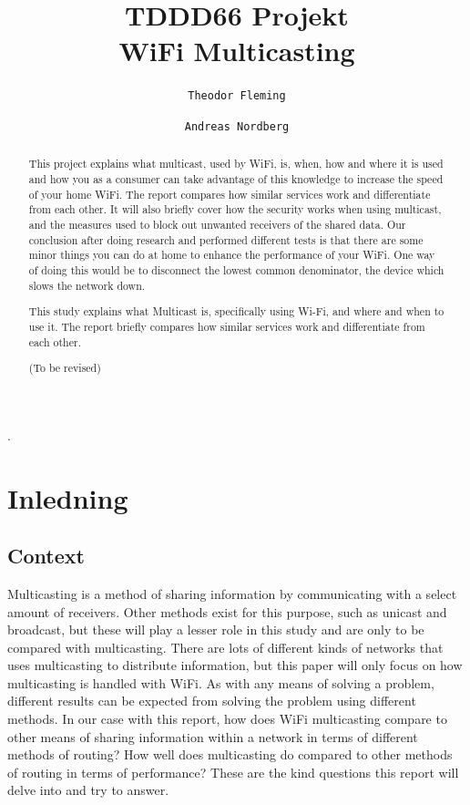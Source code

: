 \documentclass[9pt,a4paper]{acmproc}
\author{
  \texttt{Theodor Fleming}
  \and
  \texttt{Andreas Nordberg}
}
\begin{document}

\title{%
	TDDD66 Projekt \\
	\large WiFi Multicasting}
\maketitle

\clearpage
.
\clearpage

\begin{abstract}
This project explains what multicast, used by WiFi, is, when, how and where it is used and how you as a consumer can take advantage of this knowledge to increase the speed of your home WiFi. The report compares how similar services work and differentiate from each other. It will also briefly cover how the security works when using multicast, and the measures used to block out unwanted receivers of the shared data.
Our conclusion after doing research and performed different tests is that there are some minor things you can do at home to enhance the performance of your WiFi. One way of doing this would be to disconnect the lowest common denominator, the device which slows the network down.

This study explains what Multicast is, specifically using Wi-Fi, and where and when to use it. The report briefly compares how similar services work and differentiate from each other. 



(To be revised)
\end{abstract}

\clearpage

\section{Inledning}

\subsection{Context}

Multicasting is a method of sharing information by communicating with a select amount of receivers. Other methods exist for this purpose, such as unicast and broadcast, but these will play a lesser role in this study and are only to be compared with multicasting. There are lots of different kinds of networks that uses multicasting to distribute information, but this paper will only focus on how multicasting is handled with WiFi. As with any means of solving a problem, different results can be expected from solving the problem using different methods. In our case with this report, how does WiFi multicasting compare to other means of sharing information within a network in terms of different methods of routing? How well does multicasting do compared to other methods of routing in terms of performance? These are the kind questions this report will delve into and try to answer.  
\end{document}
